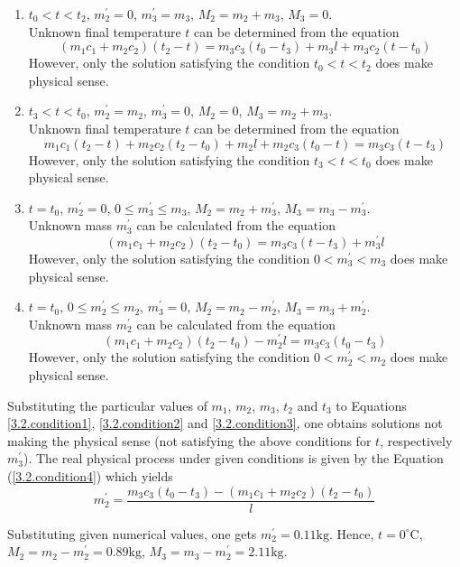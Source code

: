 \documentclass[12pt,a4paper]{book}
\begin{document}
	\begin{enumerate}
		\item $t_0<t<t_2$, $m^{'}_2=0$, $m^{'}_3=m_3$, $M_2=m_2+m_3$, $M_3=0$.\\
		Unknown f\mbox{}inal temperature $t$ can be determined from the equation
		\begin{equation}
			(m_1c_1+m_2c_2)(t_2-t)=m_3c_3(t_0-t_3)+m_3l+m_3c_2(t-t_0)
			\label{3.2.condition1}
		\end{equation}
		However, only the solution satisfying the condition $t_0<t<t_2$ does make physical sense.
		\item $t_3<t<t_0$, $m^{'}_2=m_2$, $m^{'}_3=0$, $M_2=0$, $M_3=m_2+m_3$.\\
		Unknown f\mbox{}inal temperature $t$ can be determined from the equation
		\begin{equation}
			m_1c_1(t_2-t)+m_2c_2(t_2-t_0)+m_2l+m_2c_3(t_0-t)=m_3c_3(t-t_3)
			\label{3.2.condition2}
		\end{equation}
		However, only the solution satisfying the condition $t_3<t<t_0$ does make physical sense.
		\item $t=t_0$, $m^{'}_2=0$, $0\leq m^{'}_3\leq m_3$, $M_2=m_2+m^{'}_3$, $M_3=m_3-m^{'}_3$.\\
		Unknown mass $m^{'}_3$ can be calculated from the equation
		\begin{equation}
			(m_1c_1+m_2c_2)(t_2-t_0)=m_3c_3(t-t_3)+m^{'}_3l
			\label{3.2.condition3}
		\end{equation}
		However, only the solution satisfying the condition $0<m^{'}_3<m_3$ does make physical sense.
		\item $t=t_0$, $0\leq m^{'}_2\leq m_2$, $m^{'}_3=0$, $M_2=m_2-m^{'}_2$, $M_3=m_3+m^{'}_2$.\\
		Unknown mass $m^{'}_2$ can be calculated from the equation
		\begin{equation}
			(m_1c_1+m_2c_2)(t_2-t_0)-m^{'}_2l=m_3c_3(t_0-t_3)
			\label{3.2.condition4}
		\end{equation}
		However, only the solution satisfying the condition $0<m^{'}_2<m_2$ does make physical sense.
	\end{enumerate}\par
	Substituting the particular values of $m_1$, $m_2$, $m_3$, $t_2$ and $t_3$ to Equations \ref{3.2.condition1}, \ref{3.2.condition2} and \ref{3.2.condition3}, one obtains solutions not making the physical sense (not satisfying the above conditions for $t$, respectively $m^{'}_3$). The real physical process under given conditions is given by the Equation (\ref{3.2.condition4}) which yields
	\begin{equation*}
		m^{'}_2=\frac{m_3c_3(t_0-t_3)-(m_1c_1+m_2c_2)(t_2-t_0)}{l}
	\end{equation*}\par
	Substituting given numerical values, one gets $m^{'}_2=0.11\text{kg}$. Hence, $t=0^{\circ}\mathrm{C}$, $M_2=m_2-m^{'}_2=0.89\text{kg}$, $M_3=m_3-m^{'}_2=2.11\text{kg}$.
\end{document}

